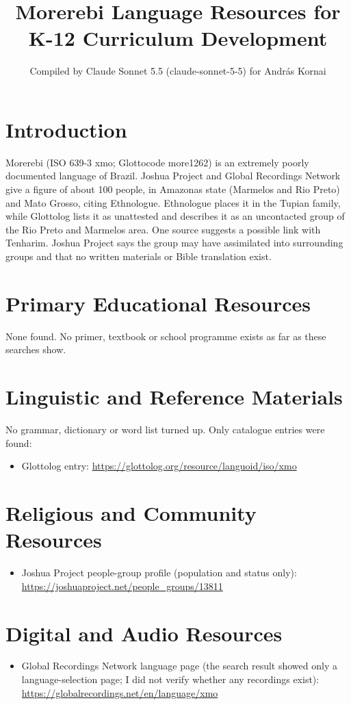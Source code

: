 \documentclass[12pt]{article}
\title{Morerebi Language Resources for K-12 Curriculum Development}
\author{Compiled by Claude Sonnet 5.5 (claude-sonnet-5-5) for Andr\'as Kornai}
\date{}
\begin{document}
\maketitle

\section{Introduction}
Morerebi (ISO 639-3 xmo; Glottocode more1262) is an extremely poorly documented language of Brazil. Joshua Project and Global Recordings Network give a figure of about 100 people, in Amazonas state (Marmelos and Rio Preto) and Mato Grosso, citing Ethnologue. Ethnologue places it in the Tupian family, while Glottolog lists it as unattested and describes it as an uncontacted group of the Rio Preto and Marmelos area. One source suggests a possible link with Tenharim. Joshua Project says the group may have assimilated into surrounding groups and that no written materials or Bible translation exist.

\section{Primary Educational Resources}
None found. No primer, textbook or school programme exists as far as these searches show.

\section{Linguistic and Reference Materials}
No grammar, dictionary or word list turned up. Only catalogue entries were found:
\begin{itemize}
\item Glottolog entry: \url{https://glottolog.org/resource/languoid/iso/xmo}
\end{itemize}

\section{Religious and Community Resources}
\begin{itemize}
\item Joshua Project people-group profile (population and status only): \url{https://joshuaproject.net/people_groups/13811}
\end{itemize}

\section{Digital and Audio Resources}
\begin{itemize}
\item Global Recordings Network language page (the search result showed only a language-selection page; I did not verify whether any recordings exist): \url{https://globalrecordings.net/en/language/xmo}
\end{itemize}
\end{document}

